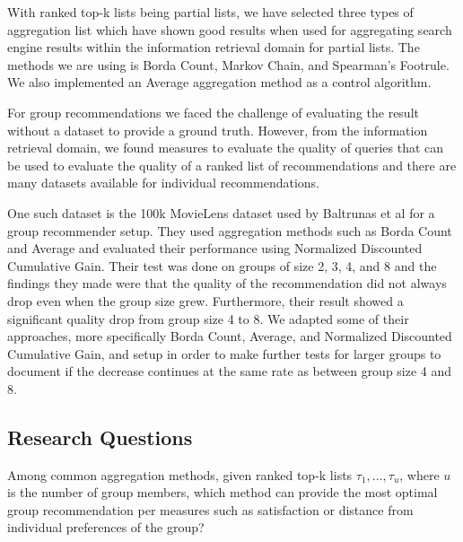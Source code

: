 With ranked top-k lists being partial lists, we have selected three types of aggregation list which have shown good results when used for aggregating search engine results within the information retrieval domain for partial lists. The methods we are using is Borda Count, Markov Chain, and Spearman's Footrule\cite{Masthoff2004, rank:aggregation}. We also implemented an Average aggregation method as a control algorithm\cite{Masthoff2004}.

For group recommendations we faced the challenge of evaluating the result without a dataset to provide a ground truth. However, from the information retrieval domain, we found measures to evaluate the quality of queries that can be used to evaluate the quality of a ranked list of recommendations and there are many datasets available for individual recommendations.

One such dataset is the 100k MovieLens dataset used by Baltrunas et al for a group recommender setup\cite{movielens100k}\citep{Baltrunas:2010:GRR:1864708.1864733}. 
They used aggregation methods such as Borda Count and Average and evaluated their performance using Normalized Discounted Cumulative Gain. Their test was done on groups of size 2, 3, 4, and 8 and the findings they made were that the quality of the recommendation did not always drop even when the group size grew. Furthermore, their result showed a significant quality drop from group size 4 to 8. We adapted some of their approaches, more specifically Borda Count, Average, and Normalized Discounted Cumulative Gain, and setup in order to make further tests for larger groups to document if the decrease continues at the same rate as between group size 4 and 8.




\subsection{Research Questions}
Among common aggregation methods, given ranked top-k lists $\tau_1, ... , \tau_u$, where $u$ is the number of group members, which method can provide the most optimal group recommendation per measures such as satisfaction or distance from individual preferences of the group?

